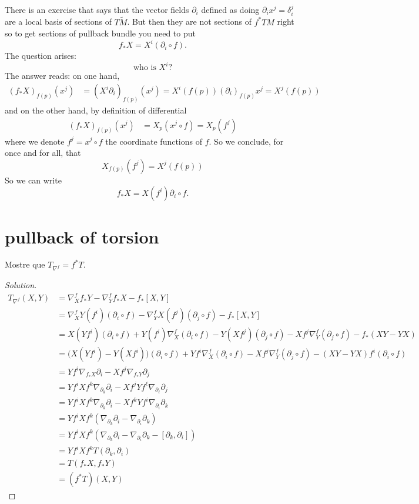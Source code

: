 There is an exercise that says that the vector fields \(\partial_i\) defined as doing \(\partial_i x^j=\delta_i^j\) are a local basis of sections of \(T\tilde{M}\). But then they are not sections of \(f^*TM\) right so to get sections of pullback bundle you need to put
\[f_* X=X^i(\partial_i \circ f).\]
The question arises:
\[\text{who is } X^i\text{?} \]
The answer reads: on one hand,
\begin{align*}
	(f_*X)_{f(p)}(x^j)&=(X^i \partial_i)_{f(p)}(x^j)=X^i(f(p))(\partial_i)_{f(p)}x^j=X^j(f(p))
\end{align*}
and on the other hand, by definition of differential
\begin{align*}
	(f_*X)_{f(p)}(x^j)&=X_p(x^j\circ f)=X_p(f^j)
\end{align*}
where we denote \(f^j=x^j \circ f\) the coordinate functions of \(f\). So we conclude, for once and for all, that
\[X_{f(p)}(f^j)=X^j(f(p))\]
So we can write
\[f_*X=X(f^i)\partial_i \circ f .\]

\section{pullback of torsion}

\begin{exercise}\leavevmode
Mostre que \(T_{\nabla^f}=f^*T\).
\end{exercise}

\begin{proof}[Solution]

\begin{align*}
	T_{\nabla^f}(X,Y)&=\nabla^f_X f_*Y-\nabla^f_Yf_*X-f_*[X,Y]\\
			 &=\nabla^f_XY(f^i)(\partial_i \circ f)-\nabla^f_YX(f^j)(\partial_j\circ f)-f_*[X,Y]\\
			 &=X(Yf^i)(\partial_i \circ f)+Y(f^i)\nabla^f_X(\partial_i \circ f)-Y(Xf^j)(\partial_j\circ f)-Xf^j \nabla^f_Y (\partial_j \circ f)-f_*(XY-YX)\\
			 &=\Big(X(Yf^i)-Y(Xf^i)\Big)(\partial_i \circ f)+Yf^i\nabla^f_X(\partial_i \circ f)-Xf^j\nabla^f_Y(\partial_j \circ f)-(XY-YX)f^i(\partial_i \circ f)\\
			 &=Yf^i \nabla_{f_*X}\partial_i-Xf^j \nabla_{f_*Y}\partial_j\\
&=Yf^iXf^k\nabla_{\partial_k}\partial_i-Xf^jYf^\ell \nabla_{\partial_\ell}\partial_j\\
&=Yf^iXf^k \nabla_{\partial_k}\partial_i-Xf^kYf^i \nabla_{\partial_i}\partial_k\\
&=Yf^iXf^k(\nabla_{\partial_k}\partial_i-\nabla_{\partial_i}\partial_k)\\
&=Yf^iXf^k(\nabla_{\partial_k}\partial_i-\nabla_{\partial_i}\partial_k-[\partial_k,\partial_i])\\
&=Yf^iXf^kT(\partial_k,\partial_i)\\
&=T(f_*X,f_*Y)\\
&=(f^*T)(X,Y)
\end{align*}
\end{proof}



